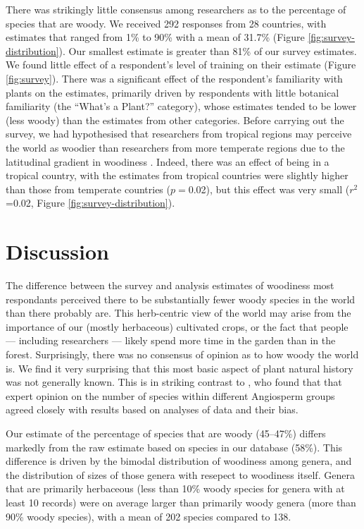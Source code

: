 \documentclass[a4paper,12pt]{article}
\begin{document}
There was strikingly little consensus among researchers as to the
percentage of species that are woody.  We received 292 responses from
28 countries, with estimates that ranged from 1\% to 90\% with a mean
of 31.7\% (Figure \ref{fig:survey-distribution}).  Our smallest
estimate is greater than 81\% of our survey estimates.
We found little effect of a respondent's level of training on their
estimate (Figure \ref{fig:survey}).  There was a significant effect of
the respondent's familiarity with plants on the estimates, primarily
driven by respondents with little botanical familiarity (the ``What's
a Plant?'' category), whose estimates tended to be lower (less woody)
than the estimates from other categories.
%
Before carrying out the survey, we had hypothesised that researchers
from tropical regions may perceive the world as woodier than
researchers from more temperate regions due to the latitudinal
gradient in woodiness \citep{Molesheihgt}.
%
Indeed, there was an effect of being in a tropical country, with the
estimates from tropical countries were slightly higher than those from
temperate countries ($p=$0.02), but this effect was very small
($r^2$=0.02, Figure \ref{fig:survey-distribution}).

\section{Discussion}

The difference between the survey and analysis estimates of woodiness
most respondants perceived there to be substantially fewer woody
species in the world than there probably are.  This herb-centric view
of the world may arise from the importance of our (mostly herbaceous)
cultivated crops, or the fact that people --- including researchers
--- likely spend more time in the garden than in the forest.
%
Surprisingly, there was no consensus of opinion as to how woody the
world is.  We find it very surprising that this most basic aspect of
plant natural history was not generally known.  This is in striking
contrast to \citep{joppa2010}, who found that that expert opinion on
the number of species within different Angiosperm groups agreed
closely with results based on analyses of data and their bias.

Our estimate of the percentage of species that are woody (45--47\%)
differs markedly from the raw estimate based on species in our
database (58\%).
%
This difference is driven by the bimodal distribution of woodiness
among genera, and the distribution of sizes of those genera with
resepect to woodiness itself.
%
Genera that are primarily herbaceous (less than 10\% woody species for
genera with at least 10 records) were on average larger than primarily
woody genera (more than 90\% woody species), with a mean of 202
species compared to 138.
\end{document}
